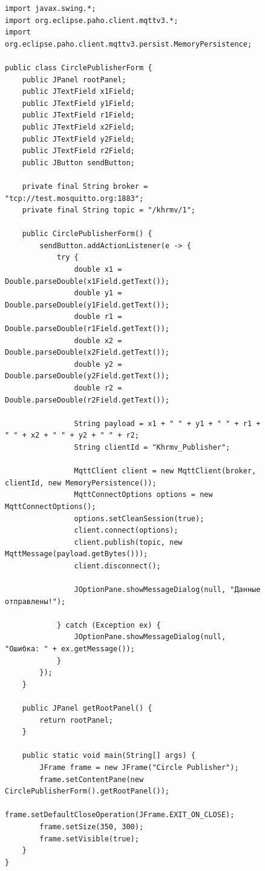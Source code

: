 \documentclass[a4paper, 14pt]{extarticle}
\begin{document}
\begin{figure}[!htb]
\begin{lstlisting}[language={},caption={реализация с swing Ui designer},label={lst:code3}]
import javax.swing.*;
import org.eclipse.paho.client.mqttv3.*;
import org.eclipse.paho.client.mqttv3.persist.MemoryPersistence;

public class CirclePublisherForm {
    public JPanel rootPanel;
    public JTextField x1Field;
    public JTextField y1Field;
    public JTextField r1Field;
    public JTextField x2Field;
    public JTextField y2Field;
    public JTextField r2Field;
    public JButton sendButton;

    private final String broker = "tcp://test.mosquitto.org:1883";
    private final String topic = "/khrmv/1";

    public CirclePublisherForm() {
        sendButton.addActionListener(e -> {
            try {
                double x1 = Double.parseDouble(x1Field.getText());
                double y1 = Double.parseDouble(y1Field.getText());
                double r1 = Double.parseDouble(r1Field.getText());
                double x2 = Double.parseDouble(x2Field.getText());
                double y2 = Double.parseDouble(y2Field.getText());
                double r2 = Double.parseDouble(r2Field.getText());

                String payload = x1 + " " + y1 + " " + r1 + " " + x2 + " " + y2 + " " + r2;
                String clientId = "Khrmv_Publisher";

                MqttClient client = new MqttClient(broker, clientId, new MemoryPersistence());
                MqttConnectOptions options = new MqttConnectOptions();
                options.setCleanSession(true);
                client.connect(options);
                client.publish(topic, new MqttMessage(payload.getBytes()));
                client.disconnect();

                JOptionPane.showMessageDialog(null, "Данные отправлены!");

            } catch (Exception ex) {
                JOptionPane.showMessageDialog(null, "Ошибка: " + ex.getMessage());
            }
        });
    }

    public JPanel getRootPanel() {
        return rootPanel;
    }

    public static void main(String[] args) {
        JFrame frame = new JFrame("Circle Publisher");
        frame.setContentPane(new CirclePublisherForm().getRootPanel());
        frame.setDefaultCloseOperation(JFrame.EXIT_ON_CLOSE);
        frame.setSize(350, 300);
        frame.setVisible(true);
    }
}

\end{lstlisting}
\end{figure}
\end{document}
